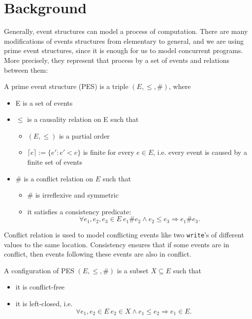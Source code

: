 \section{Background}

Generally, event structures can model a process of computation. 
There are many modifications of events structures from elementary to general, 
and we are using prime event structures, since it is enough for us to model 
concurrent programs. More precisely, they represent that process by a set of events 
and relations between them: 
\begin{definition} 
\label{es_def}
A prime event structure (PES) is a triple $(E, \leq, \#)$, where
\begin{itemize}
  \item E is a set of events
  \item $\leq$ is a causality relation on E such that 
  \begin{itemize}
    \item $ (E, \leq) $ is a partial order
    \item $\lceil e \rceil := \{ e' : e' < e \}$ is finite for every $e \in E$, 
    i.e. every event is caused by a finite set of events
  \end{itemize}
  \item $\#$ is a conflict relation on $E$ such that
  \begin{itemize}
    \item $\#$ is irreflexive and symmetric
    \item it satisfies a consistency predicate:
    $$\forall e_1, e_2, e_3 \in E \ e_1 \# e_2 \land e_2 \leq e_3 \Rightarrow e_1 \# e_3.$$
  \end{itemize}
\end{itemize}
\end{definition}

Conflict relation is used to model conflicting events like two \texttt{write}'s 
of different values to the same location.
Consistency ensures that if some events are in conflict, then events 
following these events are also in conflict.

\begin{definition}
A configuration of PES $(E, \leq, \#)$ is a subset $X \subseteq E$ such that
\begin{itemize}
  \item it is conflict-free
  \item it is left-closed, i.e. $$\forall e_1, e_2 \in E \ e_2 \in X \land e_1 \leq e_2 \Rightarrow e_1 \in E.$$
\end{itemize}
\end{definition}

